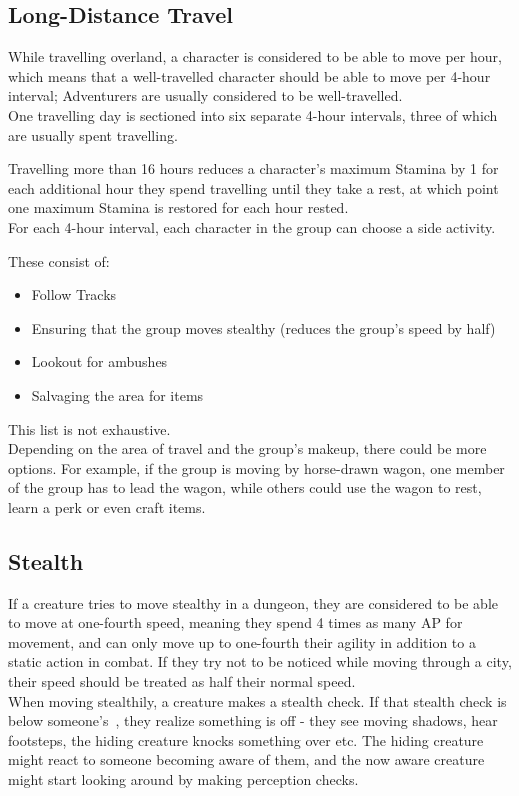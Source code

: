 \subsection{Long-Distance Travel}\label{subsec:longDistanceTravel}
While travelling overland, a character is considered to be able to move  per hour, which means that a well-travelled character should be able to move  per 4-hour interval;
Adventurers are usually considered to be well-travelled.\\

One travelling day is sectioned into six separate 4-hour intervals, three of which are usually spent travelling.

Travelling more than 16 hours reduces a character's maximum Stamina by 1 for each additional hour they spend travelling until they take a rest, at which point one maximum Stamina is restored for each hour rested.\\

For each 4-hour interval, each character in the group can choose a side activity.

These consist of:

\begin{itemize}
	\item Follow Tracks

	\item Ensuring that the group moves stealthy (reduces the group's speed by half)

	\item Lookout for ambushes

	\item Salvaging the area for items

\end{itemize}
This list is not exhaustive.\\

Depending on the area of travel and the group's makeup, there could be more options.
For example, if the group is moving by horse-drawn wagon, one member of the group has to lead the wagon, while others could use the wagon to rest, learn a perk or even craft items.

\subsection{Stealth}\label{subsec:stealth}
If a creature tries to move stealthy in a dungeon, they are considered to be able to move at one-fourth speed, meaning they spend 4 times as many AP for movement, and can only move up to one-fourth their agility in addition to a static action in combat.
If they try not to be noticed while moving through a city, their speed should be treated as half their normal speed.\\
When moving stealthily, a creature makes a stealth check.
If that stealth check is below someone's~, they realize something is off - they see moving shadows, hear footsteps, the hiding creature knocks something over etc.
The hiding creature might react to someone becoming aware of them, and the now aware creature might start looking around by making perception checks.

